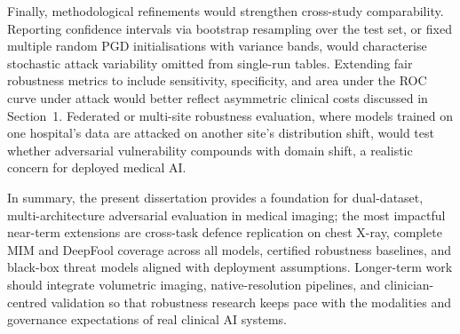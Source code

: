 \documentclass[12pt,a4paper,oneside]{report}
\begin{document}
Finally, methodological refinements would strengthen cross-study comparability. Reporting confidence intervals via bootstrap resampling over the test set, or fixed multiple random PGD initialisations with variance bands, would characterise stochastic attack variability omitted from single-run tables. Extending fair robustness metrics to include sensitivity, specificity, and area under the ROC curve under attack would better reflect asymmetric clinical costs discussed in Section~1. Federated or multi-site robustness evaluation, where models trained on one hospital's data are attacked on another site's distribution shift, would test whether adversarial vulnerability compounds with domain shift, a realistic concern for deployed medical AI.

In summary, the present dissertation provides a foundation for dual-dataset, multi-architecture adversarial evaluation in medical imaging; the most impactful near-term extensions are cross-task defence replication on chest X-ray, complete MIM and DeepFool coverage across all models, certified robustness baselines, and black-box threat models aligned with deployment assumptions. Longer-term work should integrate volumetric imaging, native-resolution pipelines, and clinician-centred validation so that robustness research keeps pace with the modalities and governance expectations of real clinical AI systems.
\end{document}
